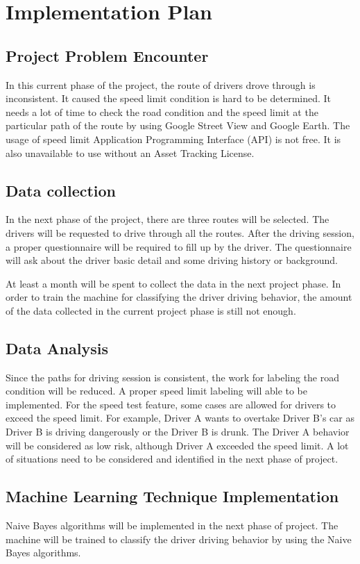 \chapter{Implementation Plan}
\section{Project Problem Encounter}
In this current phase of the project, the route of drivers drove through is inconsistent. It caused the speed limit condition is hard to be determined. It needs a lot of time to check the road condition and the speed limit at the particular path of the route by using Google Street View and Google Earth. The usage of speed limit Application Programming Interface (API) is not free. It is also unavailable to use without an Asset Tracking License.

\section{Data collection}
In the next phase of the project, there are three routes will be selected. The drivers will be requested to drive through all the routes. After the driving session, a proper questionnaire will be required to fill up by the driver. The questionnaire will ask about the driver basic detail and some driving history or background.

At least a month will be spent to collect the data in the next project phase. In order to train the machine for classifying the driver driving behavior, the amount of the data collected in the current project phase is still not enough.

\section{Data Analysis}
Since the paths for driving session is consistent, the work for labeling the road condition will be reduced. A proper speed limit labeling will able to be implemented. For the speed test feature, some cases are allowed for drivers to exceed the speed limit. For example, Driver A wants to overtake Driver B's car as Driver B is driving dangerously or the Driver B is drunk. The Driver A behavior will be considered as low risk, although Driver A exceeded the speed limit. A lot of situations need to be considered and identified in the next phase of project.

\section{Machine Learning Technique Implementation}
Naive Bayes algorithms will be implemented in the next phase of project. The machine will be trained to classify the driver driving behavior by using the Naive Bayes algorithms. 

